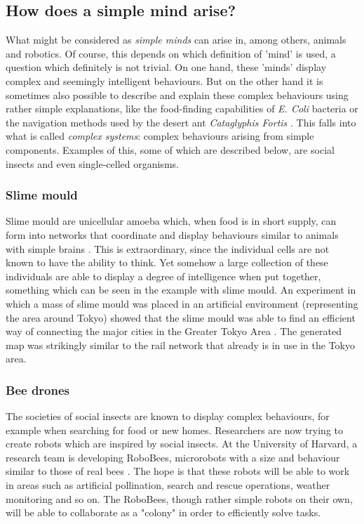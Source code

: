 \documentclass[11pt]{article}
\begin{document}
\subsection{How does a simple mind arise?}

What might be considered as \textit{simple minds} can arise in, among others, animals and robotics. Of course, this depends on which definition of 'mind' is used, a question which definitely is not trivial. On one hand, these 'minds' display complex and seemingly intelligent behaviours. But on the other hand it is sometimes also possible to describe and explain these complex behaviours using rather simple explanations, like the food-finding capabilities of \textit{E. Coli} bacteria or the navigation methods used by the desert ant \textit{Cataglyphis Fortis} \cite{wahde2015autonomous}. This falls into what is called \textit{complex systems}: complex behaviours arising from simple components. Examples of this, some of which are described below, are social insects and even single-celled organisms.

\subsubsection*{Slime mould}

Slime mould are unicellular amoeba which, when food is in short supply, can form into networks that coordinate and display behaviours similar to animals with simple brains \cite{john2009social}. This is extraordinary, since the individual cells are not known to have the ability to think. Yet somehow a large collection of these individuals are able to display a degree of intelligence when put together, something which can be seen in the example with slime mould. An experiment in which a mass of slime mould was placed in an artificial environment (representing the area around Tokyo) showed that the slime mould was able to find an efficient way of connecting the major cities in the Greater Tokyo Area \cite{tero2010rules}. The generated map was strikingly similar to the rail network that already is in use in the Tokyo area.

\subsubsection*{Bee drones}

The societies of social insects are known to display complex behaviours, for example when searching for food or new homes. Researchers are now trying to create robots which are inspired by social insects. At the University of Harvard, a research team is developing RoboBees, microrobots with a size and behaviour similar to those of real bees \cite{robobees2015}. The hope is that these robots will be able to work in areas such as artificial pollination, search and rescue operations, weather monitoring and so on. The RoboBees, though rather simple robots on their own, will be able to collaborate as a "colony" in order to efficiently solve tasks. 
\end{document}
